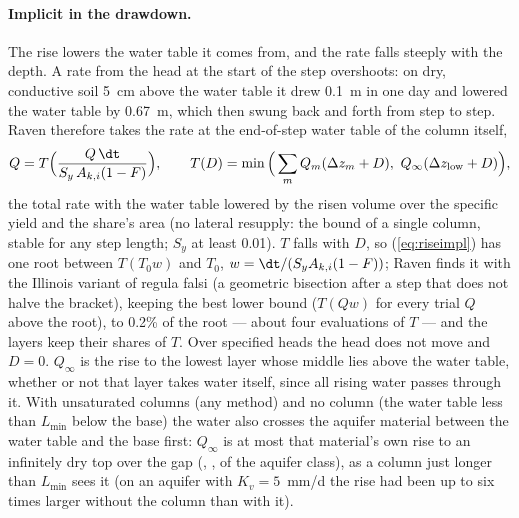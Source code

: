 \paragraph{Implicit in the drawdown.} The rise lowers the water table it comes from, and the rate falls steeply with the
depth. A rate from the head at the start of the step overshoots: on dry, conductive soil 5~cm above the water table it
drew 0.1~m in one day and lowered the water table by 0.67~m, which then swung back and forth from step to step. Raven
therefore takes the rate at the end-of-step water table of the column itself,
\begin{equation}\label{eq:riseimpl}
Q=T\Big(\frac{Q\,\dt}{S_y\,A_{k,i}(1-F)}\Big),\qquad T(D)=\min\Big(\sum_m Q_m(\Delta z_m+D),\ Q_{\infty}(\Delta z_{\mathrm{low}}+D)\Big),
\end{equation}
the total rate with the water table lowered by the risen volume over the specific yield and the share's area (no
lateral resupply: the bound of a single column, stable for any step length; $S_y$ at least 0.01). $T$ falls with $D$,
so (\ref{eq:riseimpl}) has one root between $T(T_0w)$ and $T_0$, $w=\dt/(S_yA_{k,i}(1-F))$; Raven finds it with the
Illinois variant of regula falsi (a geometric bisection after a step that does not halve the bracket), keeping the best
lower bound ($T(Qw)$ for every trial $Q$ above the root), to 0.2\% of the root --- about four evaluations of $T$ ---
and the layers keep their shares of $T$. Over specified heads the head does not move and $D=0$. $Q_\infty$ is the rise to
the lowest layer whose middle lies above the water table, whether or not that layer takes water itself, since all rising
water passes through it. With unsaturated columns (any  method) and no column (the water table less than $L_{\min}$ below
the base) the water also crosses the aquifer material between the water table and the base first: $Q_\infty$ is at most
that material's own rise to an infinitely dry top over the gap (, , 
of the aquifer class), as a column just longer than $L_{\min}$ sees it (on an aquifer with $K_v=5$~mm/d
the rise had been up to six times larger without the column than with it).

